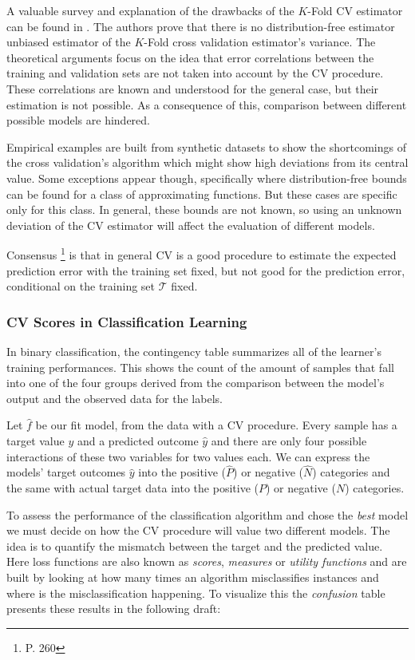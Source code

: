 A valuable survey and explanation of the drawbacks of the $K$-Fold CV estimator can be found in \textcite{bengio-unbiasedCvEstimator}. The authors prove that there is no distribution-free estimator unbiased estimator of the $K$-Fold cross validation estimator's variance. The theoretical arguments focus on the idea that error correlations between the training and validation sets are not taken into account by the CV procedure. These correlations are known and understood for the general case, but their estimation is not possible. As a consequence of this, comparison between different possible models are hindered.

Empirical examples are built from synthetic datasets to show the shortcomings of the cross validation's algorithm which might show high deviations from its central value. Some exceptions appear though, specifically where distribution-free bounds can be found for a class of approximating functions. But these cases are specific only for this class. In general, these bounds are not known, so using an unknown deviation of the CV estimator will affect the evaluation of different models.

Consensus \footnote{\textcite{hastie-elemstatslearn} P. 260} is that in general CV is a good procedure to estimate the expected prediction error with the training set fixed, but not good for the prediction error, conditional on the training set $\mathcal{T}$ fixed.



\subsubsection{CV Scores in Classification Learning}

In binary classification, the contingency table summarizes all of the learner's training performances. This shows the count of the amount of samples that fall into one of the four groups derived from the comparison between the model's output and the observed data for the labels.

 Let $\hat{f}$ be our fit model, from the data with a CV procedure. Every sample has a target value $y$ and a predicted outcome $\hat{y}$ and there are only four possible interactions of these two variables for two values each. We can express the models' target outcomes $\hat{y}$ into the positive ($\hat{P}$) or negative ($\hat{N}$) categories and the same with actual target data into the positive ($P$) or negative ($N$) categories.

To assess the performance of the classification algorithm and chose the \textit{best} model we must decide on how the CV procedure will value two different models. The idea is to quantify the mismatch between the target and the predicted value. Here loss functions are also known as \textit{scores}, \textit{measures} or \textit{utility functions} and are built by looking at how many times an algorithm misclassifies instances and where is the misclassification happening. To visualize this the \textit{confusion} table presents these results in the following draft:

